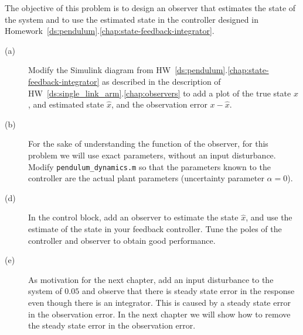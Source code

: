 
The objective of this problem is to design an observer that estimates the state of the system and to use the estimated state in the controller designed in Homework~\ref{ds:pendulum}.\ref{chap:state-feedback-integrator}.
\begin{description}\item[]
\item[(a)] Modify the Simulink diagram from HW~\ref{ds:pendulum}.\ref{chap:state-feedback-integrator} as described in the description of HW~\ref{ds:single_link_arm}.\ref{chap:observers} to add a plot of the true state $x$, and estimated state $\hat{x}$, and the observation error $x-\hat{x}$.
\item[(b)] For the sake of understanding the function of the observer, for this problem we will use exact parameters, without an input disturbance.  Modify {\tt  pendulum\_dynamics.m} so that the parameters known to the controller are the actual plant parameters (uncertainty parameter $\alpha=0$).
\item[(d)] In the control block, add an observer to estimate the state $\hat{x}$, and use the estimate of the state in your feedback controller.
Tune the poles of the controller and observer to obtain good performance.  
\item[(e)] As motivation for the next chapter, add an input disturbance to the system of $0.05$ and observe that there is steady state error in the response even though there is an integrator.  This is caused by a steady state error in the observation error.  In the next chapter we will show how to remove the steady state error in the observation error.
\end{description}
